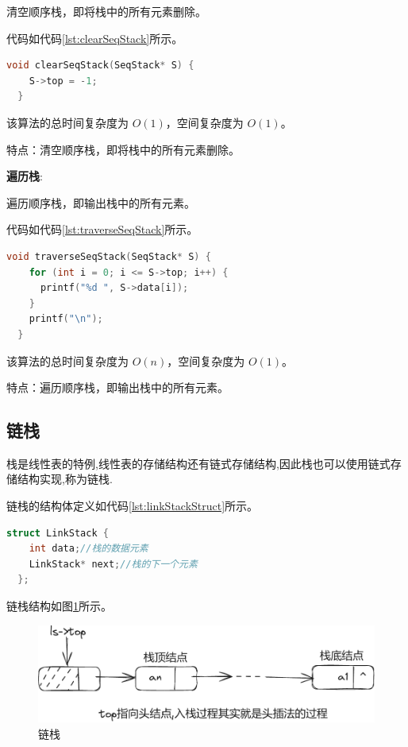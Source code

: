 \documentclass[lang=cn,newtx,10pt,scheme=chinese]{elegantbook}
\begin{document}
清空顺序栈，即将栈中的所有元素删除。

代码如代码\ref{lst:clearSeqStack}所示。

\begin{lstlisting}[language=C++, caption={清空顺序栈示例代码}, label={lst:clearSeqStack}]
  void clearSeqStack(SeqStack* S) {
    S->top = -1;
  }

\end{lstlisting}

该算法的总时间复杂度为 $O(1)$，空间复杂度为 $O(1)$。

特点：清空顺序栈，即将栈中的所有元素删除。

\textbf{遍历栈}:

遍历顺序栈，即输出栈中的所有元素。

代码如代码\ref{lst:traverseSeqStack}所示。

\begin{lstlisting}[language=C++, caption={遍历顺序栈示例代码}, label={lst:traverseSeqStack}]
  void traverseSeqStack(SeqStack* S) {
    for (int i = 0; i <= S->top; i++) {
      printf("%d ", S->data[i]);
    }
    printf("\n");
  }

\end{lstlisting}

该算法的总时间复杂度为 $O(n)$，空间复杂度为 $O(1)$。

特点：遍历顺序栈，即输出栈中的所有元素。




\subsection{链栈}

栈是线性表的特例,线性表的存储结构还有链式存储结构,因此栈也可以使用链式存储结构实现,称为链栈.

链栈的结构体定义如代码\ref{lst:linkStackStruct}所示。

\begin{lstlisting}[language=C++, caption={链栈结构体定义}, label={lst:linkStackStruct}]
  struct LinkStack {
    int data;//栈的数据元素
    LinkStack* next;//栈的下一个元素
  };
\end{lstlisting}

链栈结构如图\ref{fig:linkStack}所示。

\begin{figure}[h]
  \centering
  \includegraphics[width=1\textwidth]{./figure/pdf/cropped/linkStack.pdf}
  \caption{链栈}
  \label{fig:linkStack}
\end{figure}
\end{document}
